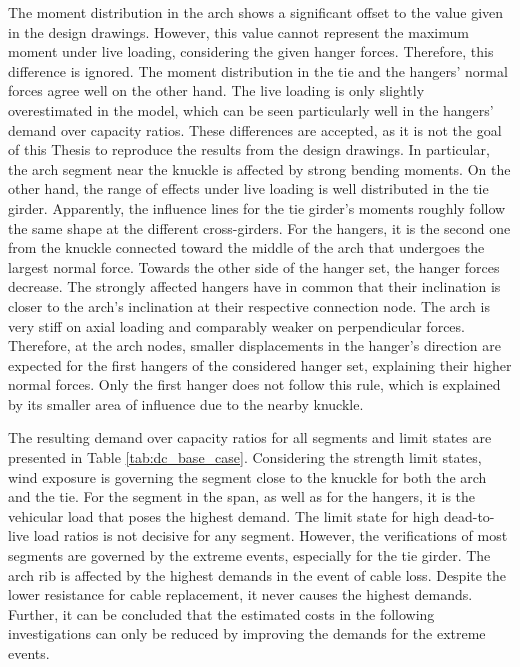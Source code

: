 The moment distribution in the arch shows a significant offset to the value given in the design drawings. However, this value cannot represent the maximum moment under live loading, considering the given hanger forces. Therefore, this difference is ignored. The moment distribution in the tie and the hangers' normal forces agree well on the other hand. The live loading is only slightly overestimated in the model, which can be seen particularly well in the hangers' demand over capacity ratios. These differences are accepted, as it is not the goal of this Thesis to reproduce the results from the design drawings. In particular, the arch segment near the knuckle is affected by strong bending moments. On the other hand, the range of effects under live loading is well distributed in the tie girder. Apparently, the influence lines for the tie girder's moments roughly follow the same shape at the different cross-girders. For the hangers, it is the second one from the knuckle connected toward the middle of the arch that undergoes the largest normal force. Towards the other side of the hanger set, the hanger forces decrease. The strongly affected hangers have in common that their inclination is closer to the arch's inclination at their respective connection node. The arch is very stiff on axial loading and comparably weaker on perpendicular forces. Therefore, at the arch nodes, smaller displacements in the hanger's direction are expected for the first hangers of the considered hanger set, explaining their higher normal forces. Only the first hanger does not follow this rule, which is explained by its smaller area of influence due to the nearby knuckle. \medskip

The resulting demand over capacity ratios for all segments and limit states are presented in Table \ref{tab:dc_base_case}. Considering the strength limit states, wind exposure is governing the segment close to the knuckle for both the arch and the tie. For the segment in the span, as well as for the hangers, it is the vehicular load that poses the highest demand. The limit state for high dead-to-live load ratios is not decisive for any segment. However, the verifications of most segments are governed by the extreme events, especially for the tie girder. The arch rib is affected by the highest demands in the event of cable loss. Despite the lower resistance for cable replacement, it never causes the highest demands. Further, it can be concluded that the estimated costs in the following investigations can only be reduced by improving the demands for the extreme events.

